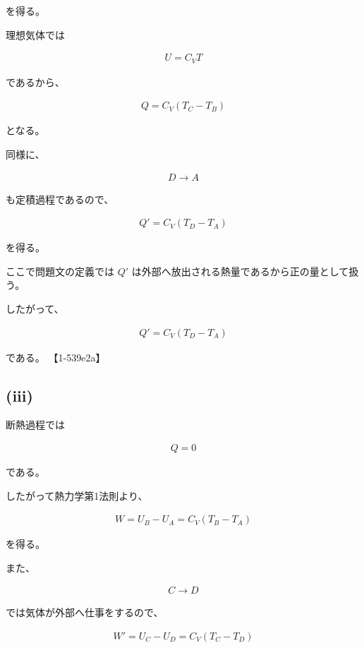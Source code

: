 \documentclass[platex,dvipdfmx,a4paper]{jsarticle}
\begin{document}
を得る。

理想気体では

\begin{align*}
U=C_VT
\end{align*}

であるから、

\begin{align*}
Q
=
C_V(T_C-T_B)
\end{align*}

となる。

同様に、

\begin{align*}
D\rightarrow A
\end{align*}

も定積過程であるので、

\begin{align*}
Q'
=
C_V(T_D-T_A)
\end{align*}

を得る。

ここで問題文の定義では $Q'$ は外部へ放出される熱量であるから正の量として扱う。

したがって、

\begin{align*}
Q'
=
C_V(T_D-T_A)
\end{align*}

である。 【1-539e2a】

\subsection{(iii)}

断熱過程では

\begin{align*}
Q=0
\end{align*}

である。

したがって熱力学第1法則より、

\begin{align*}
W
=
U_B-U_A
=
C_V(T_B-T_A)
\end{align*}

を得る。

また、

\begin{align*}
C\rightarrow D
\end{align*}

では気体が外部へ仕事をするので、

\begin{align*}
W'
=
U_C-U_D
=
C_V(T_C-T_D)
\end{align*}
\end{document}
